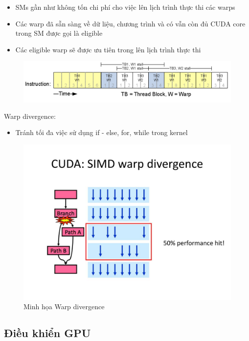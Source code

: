 \documentclass[14pt, a4paper]{article}
\numberwithin{equation}{section}
\numberwithin{figure}{section}
\numberwithin{dl}{section}
\numberwithin{md}{section}
\numberwithin{bd}{section}
\numberwithin{dn}{section}
\numberwithin{hq}{section}
\begin{document}
\begin{itemize}
    \item SMs gần như không tốn chi phí cho việc lên lịch trình thực thi các warps
    \item Các warp đã sẵn sàng về dữ liệu, chương trình và có vẫn còn đủ CUDA core trong SM được gọi là eligible
    \item Các eligible warp sẽ được ưu tiên trong lên lịch trình thực thi 
\end{itemize}

\begin{figure}[H]
    \centering
    \includegraphics[width=0.8\linewidth]{figures/CUDA/Eligible_Stall_Warps.png}
\end{figure}

Warp divergence:

\begin{itemize}
    \item Tránh tối đa việc sử dụng if - else, for, while trong kernel 
\end{itemize}
\begin{figure}[H]
    \centering
    \includegraphics[width=0.7\linewidth]{figures/CUDA/Warp_Divergence.jpg}
    \caption{Minh họa Warp divergence}
\end{figure}

\subsection{Điều khiển GPU}
\end{document}
